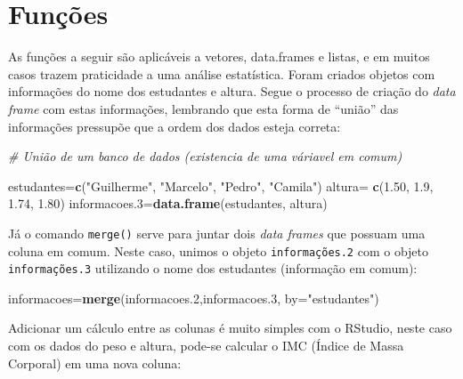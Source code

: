 \documentclass[12pt,brazil,oneside]{book}
\newenvironment{Shaded}{\begin{snugshade}}{\end{snugshade}}
\newcommand{\CommentTok}[1]{\textcolor[rgb]{0.56,0.35,0.01}{\textit{#1}}}
\newcommand{\DataTypeTok}[1]{\textcolor[rgb]{0.13,0.29,0.53}{#1}}
\newcommand{\DecValTok}[1]{\textcolor[rgb]{0.00,0.00,0.81}{#1}}
\newcommand{\FloatTok}[1]{\textcolor[rgb]{0.00,0.00,0.81}{#1}}
\newcommand{\KeywordTok}[1]{\textcolor[rgb]{0.13,0.29,0.53}{\textbf{#1}}}
\newcommand{\NormalTok}[1]{#1}
\newcommand{\OperatorTok}[1]{\textcolor[rgb]{0.81,0.36,0.00}{\textbf{#1}}}
\newcommand{\StringTok}[1]{\textcolor[rgb]{0.31,0.60,0.02}{#1}}
\begin{document}
\hypertarget{funcoes}{%
\section{Funções}\label{funcoes}}

As funções a seguir são aplicáveis a vetores, data.frames e listas, e em
muitos casos trazem praticidade a uma análise estatística. Foram criados
objetos com informações do nome dos estudantes e altura. Segue o
processo de criação do \emph{data frame} com estas informações,
lembrando que esta forma de ``união'' das informações pressupõe que a
ordem dos dados esteja correta:

\begin{Shaded}
\begin{Highlighting}[]
\CommentTok{# União de um banco de dados (existencia de uma váriavel em comum)}

\NormalTok{estudantes=}\KeywordTok{c}\NormalTok{(}\StringTok{"Guilherme"}\NormalTok{, }\StringTok{"Marcelo"}\NormalTok{, }\StringTok{"Pedro"}\NormalTok{, }\StringTok{"Camila"}\NormalTok{)}
\NormalTok{altura=}\StringTok{ }\KeywordTok{c}\NormalTok{(}\FloatTok{1.50}\NormalTok{, }\FloatTok{1.9}\NormalTok{, }\FloatTok{1.74}\NormalTok{, }\FloatTok{1.80}\NormalTok{)}
\NormalTok{informacoes}\FloatTok{.3}\NormalTok{=}\KeywordTok{data.frame}\NormalTok{(estudantes, altura)}
\end{Highlighting}
\end{Shaded}

Já o comando \texttt{merge()} serve para juntar dois \emph{data frames}
que possuam uma coluna em comum. Neste caso, unimos o objeto
\texttt{informações.2} com o objeto \texttt{informações.3} utilizando o
nome dos estudantes (informação em comum):

\begin{Shaded}
\begin{Highlighting}[]
\NormalTok{informacoes=}\KeywordTok{merge}\NormalTok{(informacoes}\FloatTok{.2}\NormalTok{,informacoes}\FloatTok{.3}\NormalTok{, }\DataTypeTok{by=}\StringTok{"estudantes"}\NormalTok{)}
\end{Highlighting}
\end{Shaded}

Adicionar um cálculo entre as colunas é muito simples com o RStudio,
neste caso com os dados do peso e altura, pode-se calcular o IMC (Índice
de Massa Corporal) em uma nova coluna:

\begin{Shaded}
\end{Shaded}
\end{document}
